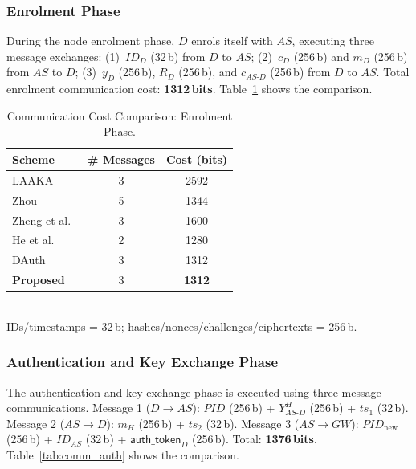 \documentclass[12pt,a4paper]{report}
\begin{document}
\subsubsection{Enrolment Phase}

During the node enrolment phase, $D$ enrols itself with $AS$, executing three message
exchanges: (1)~$ID_D$ (32\,b) from $D$ to $AS$; (2)~$c_D$ (256\,b) and $m_D$
(256\,b) from $AS$ to $D$; (3)~$y_D$ (256\,b), $R_D$ (256\,b), and $c_{AS\text{-}D}$
(256\,b) from $D$ to $AS$.
Total enrolment communication cost: \textbf{1312\,bits}.
Table~\ref{tab:comm_enroll} shows the comparison.

\begin{table}[!ht]
  \centering
  \caption{Communication Cost Comparison: Enrolment Phase.}
  \label{tab:comm_enroll}
  \small
  \setlength{\tabcolsep}{6pt}
  \begin{tabular}{lcc}
    \toprule
    Scheme & \# Messages & Cost (bits) \\
    \midrule
    LAAKA~\cite{ali2024laaka}          & 3 & 2592 \\
    Zhou~\cite{zhou2024auth}           & 5 & 1344 \\
    Zheng et al.~\cite{zheng2022puf}   & 3 & 1600 \\
    He et al.~\cite{he2023lightweight} & 2 & 1280 \\
    DAuth~\cite{das2026comsnets}        & 3 & 1312 \\
    \textbf{Proposed}                  & 3 & \textbf{1312} \\
    \bottomrule
  \end{tabular}\\[4pt]
  \small IDs/timestamps = 32\,b; hashes/nonces/challenges/ciphertexts = 256\,b.
\end{table}

\subsubsection{Authentication and Key Exchange Phase}

The authentication and key exchange phase is executed using three message
communications.
Message 1 ($D \to AS$): $\mathit{PID}$ (256\,b) + $Y_{AS\text{-}D}^H$ (256\,b) +
$ts_1$ (32\,b).
Message 2 ($AS \to D$): $m_H$ (256\,b) + $ts_2$ (32\,b).
Message 3 ($AS \to GW$): $\mathit{PID}_{\mathrm{new}}$ (256\,b) + $ID_{AS}$ (32\,b)
+ $\mathsf{auth\_token}_D$ (256\,b).
Total: \textbf{1376\,bits}.
Table~\ref{tab:comm_auth} shows the comparison.
\end{document}
